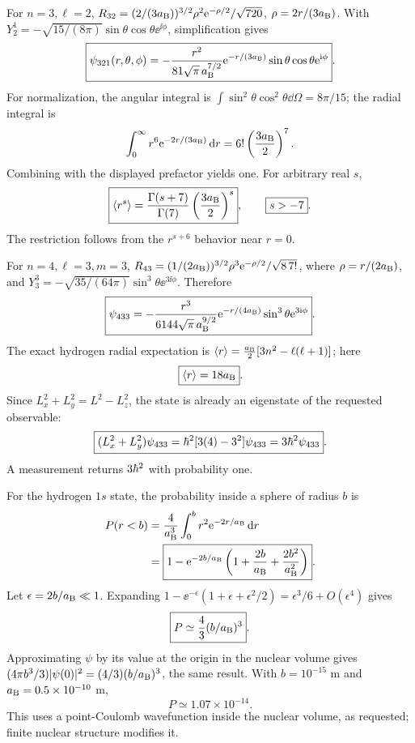 For $n=3,\ell=2$,
$R_{32}=(2/(3a_{\mathrm B}))^{3/2}\rho^2
\mathrm e^{-\rho/2}/\sqrt{720}$,
$\rho=2r/(3a_{\mathrm B})$.
With
$Y_2^1=-\sqrt{15/(8\pi)}
\sin\theta\cos\theta\ee^{\ii\phi}$,
simplification gives
\begin{equation}
\boxed{\psi_{321}(r,\theta,\phi)=
-\frac{r^2}{81\sqrt\pi\,a_{\mathrm B}^{7/2}}
\mathrm e^{-r/(3a_{\mathrm B})}
\sin\theta\cos\theta\mathrm e^{\mathrm i\phi}}.
\end{equation}
For normalization, the angular integral is
$\int\sin^2\theta\cos^2\theta\dd\Omega=8\pi/15$;
the radial integral is
\begin{equation}
\int_0^\infty r^6\mathrm e^{-2r/(3a_{\mathrm B})}\,\mathrm d r
=6!\left(\frac{3a_{\mathrm B}}{2}\right)^7.
\end{equation}
Combining with the displayed prefactor yields one.
For arbitrary real $s$,
\begin{equation}
\boxed{\langle r^s\rangle=
\frac{\Gamma(s+7)}{\Gamma(7)}
\left(\frac{3a_{\mathrm B}}{2}\right)^s},
\qquad\boxed{s>-7}.
\end{equation}
The restriction follows from the
$r^{s+6}$ behavior near $r=0$.

For $n=4,\ell=3,m=3$,
$R_{43}=(1/(2a_{\mathrm B}))^{3/2}\rho^3
\mathrm e^{-\rho/2}/\sqrt{8\,7!}$,
where $\rho=r/(2a_{\mathrm B})$, and
$Y_3^3=-\sqrt{35/(64\pi)}
\sin^3\theta\ee^{3\ii\phi}$.
Therefore
\begin{equation}
\boxed{\psi_{433}=
-\frac{r^3}{6144\sqrt\pi\,a_{\mathrm B}^{9/2}}
\mathrm e^{-r/(4a_{\mathrm B})}
\sin^3\theta\mathrm e^{3\mathrm i\phi}}.
\end{equation}
The exact hydrogen radial expectation is
$\langle r\rangle=\frac{a_{\mathrm B}}{2}[3n^2-\ell(\ell+1)]$;
here
\begin{equation}
\boxed{\langle r\rangle=18a_{\mathrm B}}.
\end{equation}
Since $L_x^2+L_y^2=L^2-L_z^2$,
the state is already an eigenstate of the
requested observable:
\begin{equation}
\boxed{(L_x^2+L_y^2)\psi_{433}
=\hbar^2[3(4)-3^2]\psi_{433}
=3\hbar^2\psi_{433}}.
\end{equation}
A measurement returns $3\hbar^2$ with probability one.

For the hydrogen $1s$ state,
the probability inside a sphere of radius $b$ is
\begin{align}
P(r<b)&=\frac4{a_{\mathrm B}^3}\int_0^b
r^2\mathrm e^{-2r/a_{\mathrm B}}\,\mathrm d r\\
&=\boxed{1-\mathrm e^{-2b/a_{\mathrm B}}
\left(1+\frac{2b}{a_{\mathrm B}}+
\frac{2b^2}{a_{\mathrm B}^2}\right)}.
\end{align}
Let $\epsilon=2b/a_{\mathrm B}\ll1$.
Expanding
$1-\ee^{-\epsilon}(1+\epsilon+\epsilon^2/2)
=\epsilon^3/6+O(\epsilon^4)$ gives
\begin{equation}
\boxed{P\simeq\frac43(b/a_{\mathrm B})^3}.
\end{equation}
Approximating $\psi$ by its value at the
origin in the nuclear volume gives
$(4\pi b^3/3)|\psi(0)|^2=
(4/3)(b/a_{\mathrm B})^3$, the same result.
With $b=10^{-15}$ m and
$a_{\mathrm B}=0.5\times10^{-10}$ m,
\begin{equation}
\boxed{P\simeq1.07\times10^{-14}}.
\end{equation}
This uses a point-Coulomb wavefunction
inside the nuclear volume, as requested;
finite nuclear structure modifies it.

